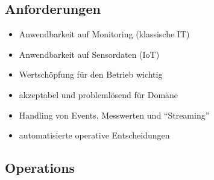 \subsection{Anforderungen}
\begin{itemize}
\item Anwendbarkeit auf Monitoring (klassische IT)
\item Anwendbarkeit auf Sensordaten (\ac{IoT})
\item Wertschöpfung für den Betrieb wichtig
\item akzeptabel und problemlösend für Domäne
\item Handling von Events, Messwerten und \enquote{Streaming}
\item automatisierte operative Entscheidungen
\end{itemize}

\subsection{Operations}

